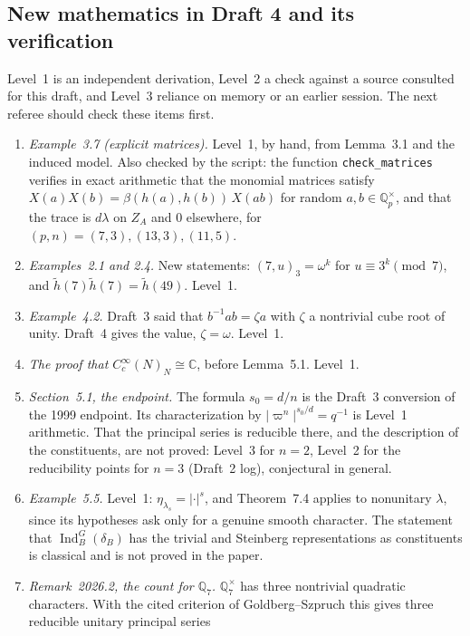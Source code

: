 \documentclass[12pt,letterpaper]{article}
\newcommand{\hl}{\tilde h}
\newcommand{\ZA}{Z_A}
\newcommand{\Qq}{\mathbb Q}
\begin{document}
\subsection{New mathematics in Draft 4 and its verification}
\label{subsec:new4}

Level~1 is an independent derivation, Level~2 a check against a source
consulted for this draft, and Level~3 reliance on memory or an earlier
session. The next referee should check these items first.

\begin{enumerate}[leftmargin=*]
\item \emph{Example~3.7 (explicit matrices).} Level~1, by hand, from
  Lemma~3.1 and the induced model. Also checked by the script: the
  function \texttt{check\_matrices} verifies in exact arithmetic that
  the monomial matrices satisfy
  $X(a)X(b)=\beta(h(a),h(b))\,X(ab)$ for random $a,b\in\Qq_p^\times$,
  and that the trace is $d\lambda$ on $\ZA$ and $0$ elsewhere, for
  $(p,n)=(7,3),(13,3),(11,5)$.
\item \emph{Examples~2.1 and 2.4.} New statements:
  $(7,u)_3=\omega^k$ for $u\equiv3^k\pmod 7$, and
  $\hl(7)\hl(7)=\hl(49)$. Level~1.
\item \emph{Example~4.2.} Draft~3 said that $b^{-1}ab=\zeta a$ with
  $\zeta$ a nontrivial cube root of unity. Draft~4 gives the value,
  $\zeta=\omega$. Level~1.
\item \emph{The proof that $C_c^\infty(N)_N\cong\mathbb C$}, before
  Lemma~5.1. Level~1.
\item \emph{Section~5.1, the endpoint.} The formula $s_0=d/n$ is the
  Draft~3 conversion of the 1999 endpoint. Its characterization by
  $|\varpi^n|^{s_0/d}=q^{-1}$ is Level~1 arithmetic. That the principal
  series is reducible there, and the description of the constituents,
  are not proved: Level~3 for $n=2$, Level~2 for the reducibility
  points for $n=3$ (Draft~2 log), conjectural in general.
\item \emph{Example~5.5.} Level~1: $\eta_{\lambda_s}=|\cdot|^s$,
  and Theorem~7.4 applies to nonunitary $\lambda$, since its
  hypotheses ask only for a genuine smooth character. The statement
  that $\operatorname{Ind}_B^G(\delta_B)$ has the trivial and Steinberg
  representations as constituents is classical and is not proved in
  the paper.
\item \emph{Remark~2026.2, the count for $\Qq_7$.} $\Qq_7^\times$ has
  three nontrivial quadratic characters. With the cited criterion of
  Goldberg--Szpruch this gives three reducible unitary principal series

\end{enumerate}
\end{document}
